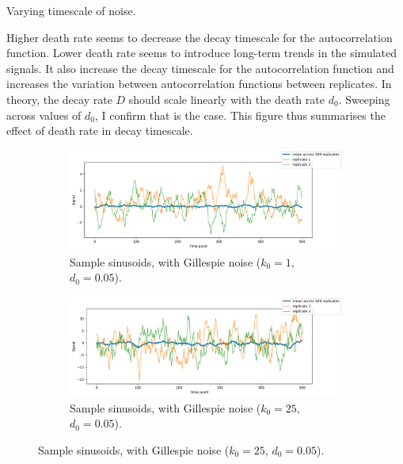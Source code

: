 Varying timescale of noise.

Higher death rate seems to decrease the decay timescale for the autocorrelation function.
Lower death rate seems to introduce long-term trends in the simulated signals.
It also increase the decay timescale for the autocorrelation function and increases the variation between autocorrelation functions between replicates.
In theory, the decay rate $D$ should scale linearly with the death rate $d_{0}$.  Sweeping across values of $d_{0}$, I confirm that is the case.
This figure thus summarises the effect of death rate in decay timescale.


\begin{figure}
  \centering
  \begin{subfigure}[t]{0.45\textwidth}
  \centering
    \includegraphics[width=\linewidth]{gillespie_k1_d0p05_mean.png}
    \caption{
      Sample sinusoids, with Gillespie noise ($k_{0} = 1$, $d_{0} = 0.05$).
    }
    \label{fig:acf-noiseamplitude-lowk0-ts}
  \end{subfigure}%
  \begin{subfigure}[t]{0.45\textwidth}
  \centering
    \includegraphics[width=\linewidth]{gillespie_k25_d0p05_mean.png}
    \caption{
      Sample sinusoids, with Gillespie noise ($k_{0} = 25$, $d_{0} = 0.05$).
    }
    \label{fig:acf-noiseamplitude-highk0-ts}
  \end{subfigure}


\end{figure}
